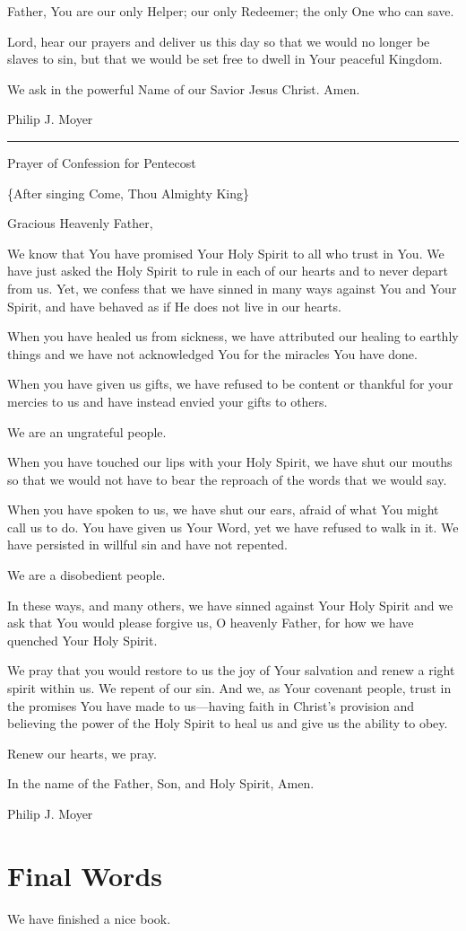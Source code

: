 \documentclass[]{book}
\begin{document}
Father, You are our only Helper; our only Redeemer; the only One who can
save.

Lord, hear our prayers and deliver us this day so that we would no
longer be slaves to sin, but that we would be set free to dwell in Your
peaceful Kingdom.

We ask in the powerful Name of our Savior Jesus Christ. Amen.

Philip J. Moyer

\begin{center}\rule{0.5\linewidth}{\linethickness}\end{center}

Prayer of Confession for Pentecost

\{After singing Come, Thou Almighty King\}

Gracious Heavenly Father,

We know that You have promised Your Holy Spirit to all who trust in You.
We have just asked the Holy Spirit to rule in each of our hearts and to
never depart from us. Yet, we confess that we have sinned in many ways
against You and Your Spirit, and have behaved as if He does not live in
our hearts.

When you have healed us from sickness, we have attributed our healing to
earthly things and we have not acknowledged You for the miracles You
have done.

When you have given us gifts, we have refused to be content or thankful
for your mercies to us and have instead envied your gifts to others.

We are an ungrateful people.

When you have touched our lips with your Holy Spirit, we have shut our
mouths so that we would not have to bear the reproach of the words that
we would say.

When you have spoken to us, we have shut our ears, afraid of what You
might call us to do. You have given us Your Word, yet we have refused to
walk in it. We have persisted in willful sin and have not repented.

We are a disobedient people.

In these ways, and many others, we have sinned against Your Holy Spirit
and we ask that You would please forgive us, O heavenly Father, for how
we have quenched Your Holy Spirit.

We pray that you would restore to us the joy of Your salvation and renew
a right spirit within us. We repent of our sin. And we, as Your covenant
people, trust in the promises You have made to us---having faith in
Christ's provision and believing the power of the Holy Spirit to heal us
and give us the ability to obey.

Renew our hearts, we pray.

In the name of the Father, Son, and Holy Spirit, Amen.

Philip J. Moyer

\chapter{Final Words}\label{final-words}

We have finished a nice book.


\end{document}
